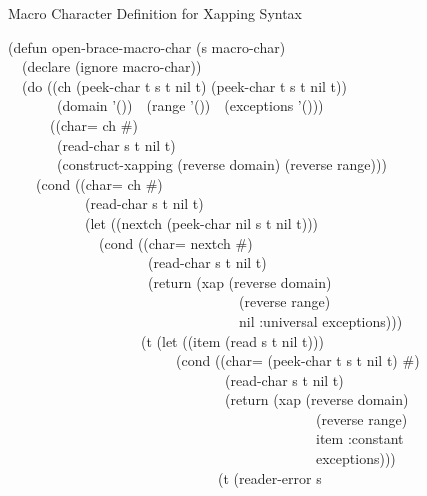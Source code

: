 {\newpage
\clearpage
\samepage \Xarrowright
}

{\newpage
\clearpage
\samepage \begin{table}%
\begin{new}
\caption{Macro Character Definition for Xapping Syntax}
\label{XAPPING-MACRO-CHAR-TABLE}
\begin{lisp}
(defun open-brace-macro-char (s macro-char) \\ 
~~(declare (ignore macro-char)) \\ 
~~(do ((ch (peek-char t s t nil t) (peek-char t s t nil t)) \\ 
~~~~~~~(domain '())~~(range '())~~(exceptions '())) \\ 
~~~~~~((char= ch \#{\Xbackslash}{\Xrbrace}) \\ 
~~~~~~~(read-char s t nil t) \\ 
~~~~~~~(construct-xapping (reverse domain) (reverse range))) \\ 
~~~~(cond ((char= ch \#{\Xbackslash}{\Xarrowright}) \\ 
~~~~~~~~~~~(read-char s t nil t) \\ 
~~~~~~~~~~~(let ((nextch (peek-char nil s t nil t))) \\ 
~~~~~~~~~~~~~(cond ((char= nextch \#{\Xbackslash}{\Xrbrace}) \\ 
~~~~~~~~~~~~~~~~~~~~(read-char s t nil t) \\ 
~~~~~~~~~~~~~~~~~~~~(return (xap (reverse domain) \\ 
~~~~~~~~~~~~~~~~~~~~~~~~~~~~~~~~~(reverse range) \\ 
~~~~~~~~~~~~~~~~~~~~~~~~~~~~~~~~~nil :universal exceptions))) \\ 
~~~~~~~~~~~~~~~~~~~(t (let ((item (read s t nil t))) \\ 
~~~~~~~~~~~~~~~~~~~~~~~~(cond ((char= (peek-char t s t nil t) \#{\Xbackslash}{\Xrbrace}) \\ 
~~~~~~~~~~~~~~~~~~~~~~~~~~~~~~~(read-char s t nil t) \\ 
~~~~~~~~~~~~~~~~~~~~~~~~~~~~~~~(return (xap (reverse domain) \\ 
~~~~~~~~~~~~~~~~~~~~~~~~~~~~~~~~~~~~~~~~~~~~(reverse range) \\ 
~~~~~~~~~~~~~~~~~~~~~~~~~~~~~~~~~~~~~~~~~~~~item :constant \\ 
~~~~~~~~~~~~~~~~~~~~~~~~~~~~~~~~~~~~~~~~~~~~exceptions))) \\ 
~~~~~~~~~~~~~~~~~~~~~~~~~~~~~~(t (reader-error s \\ 

\end{lisp}
\end{new}
\end{table}}
